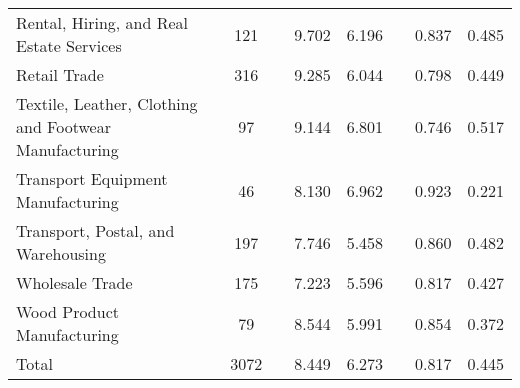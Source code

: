 \begin{tabular}{lccccccc}
Rental, Hiring, and Real Estate Services & 121 & & 9.702 & 6.196 & & 0.837 & 0.485 \\
Retail Trade & 316 & & 9.285 & 6.044 & & 0.798 & 0.449 \\
Textile, Leather, Clothing and Footwear Manufacturing & 97 & & 9.144 & 6.801 & & 0.746 & 0.517 \\
Transport Equipment Manufacturing & 46 & & 8.130 & 6.962 & & 0.923 & 0.221 \\
Transport, Postal, and Warehousing & 197 & & 7.746 & 5.458 & & 0.860 & 0.482 \\
Wholesale Trade & 175 & & 7.223 & 5.596 & & 0.817 & 0.427 \\
Wood Product Manufacturing & 79 & & 8.544 & 5.991 & & 0.854 & 0.372 \\
\midrule
Total & 3072 & & 8.449 & 6.273 & & 0.817 & 0.445 \\ \bottomrule
\end{tabular}
